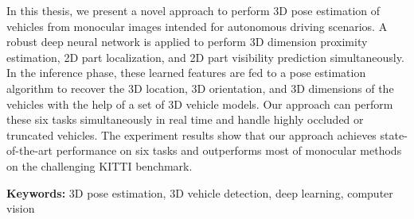 In this thesis, we present a novel approach to perform 3D pose estimation of vehicles from monocular images intended for autonomous driving scenarios. A robust deep neural network is applied to perform 3D dimension proximity estimation, 2D part localization, and 2D part visibility prediction simultaneously. In the inference phase, these learned features are fed to a pose estimation algorithm to recover the 3D location, 3D orientation, and 3D dimensions of the vehicles with the help of a set of 3D vehicle models. Our approach can perform these six tasks simultaneously in real time and handle highly occluded or truncated vehicles. The experiment results show that our approach achieves state-of-the-art performance on six tasks and outperforms most of monocular methods on the challenging KITTI benchmark.

\textbf{Keywords:} 3D pose estimation, 3D vehicle detection, deep learning, computer vision